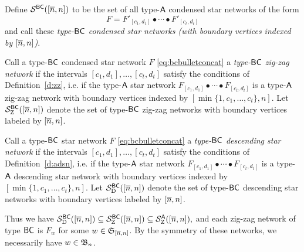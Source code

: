 \documentclass[11pt]{article}
\theoremstyle{definition}
\numberwithin{equation}{section}
\begin{document}
\begin{defn}\label{d:bcstarnet}
  Define $\mathcal S^{\mathsf{BC}}([\overline{n}, n])$ to be
  the set of all type-$\mathsf{A}$ condensed star networks of the form
\begin{equation}\label{eq:bcbulletconcat}
  F = F'_{[c_1,d_1]} \bullet \cdots \bullet F'_{[c_t,d_t]}
  \end{equation}
and call these
{\em type-$\mathsf{BC}$ condensed star networks
  (with boundary vertices indexed by $[\overline{n},n]$)}.
\end{defn}
\begin{defn}\label{d:bczzn}
Call a type-$\mathsf{BC}$ condensed star network $F$ \eqref{eq:bcbulletconcat} a
{\em type-$\mathsf{BC}$ zig-zag network} if
the intervals $[c_1,d_1],\dotsc,[c_t,d_t]$
satisfy the conditions of Definition~\ref{d:zz},
i.e. if the type-$\mathsf{A}$ star network
$F_{[c_1,d_1]} \bullet \cdots \bullet F_{[c_t,d_t]}$
is a type-$\mathsf{A}$ zig-zag network with boundary vertices indexed by
$[ \min\{1,c_1,\dotsc,c_t\}, n]$.
Let $\mathcal S^{\mathsf{BC}}_{\mathrm Z}([\overline{n},n])$
denote the set of type-$\mathsf{BC}$ zig-zag networks with boundary vertices
labeled by $[\overline{n},n]$.
\end{defn}
\begin{defn}\label{d:bcdsn}
Call a type-$\mathsf{BC}$ star network $F$ \eqref{eq:bcbulletconcat} a
{\em type-$\mathsf{BC}$ descending star network} if
the intervals $[c_1,d_1],\dotsc,[c_t,d_t]$
satisfy the conditions of Definition~\ref{d:adsn},
i.e. if the type-$\mathsf{A}$ star network
$F_{[c_1,d_1]} \bullet \cdots \bullet F_{[c_t,d_t]}$
is a type-$\mathsf{A}$ descending star network with boundary vertices indexed by
$[ \min\{1, c_1,\dotsc,c_t\}, n]$.
Let $\mathcal S^{\mathsf{BC}}_{\mathrm D}([\overline{n},n])$
denote the set of type-$\mathsf{BC}$ descending star
networks with boundary vertices
labeled by $[\overline{n},n]$.
\end{defn}
Thus we have $\mathcal S^{\mathsf{BC}}_{\mathrm D}([\overline{n},n]) \subseteq \mathcal S^{\mathsf{BC}}_{\mathrm Z}([\overline{n},n])
\subseteq \mathcal S^{\mathsf{A}}_{\mathrm Z}([\overline{n},n]),$
and each zig-zag network of type $\mathsf{BC}$
is $F_w$ for some $w \in \mathfrak{S}_{[\overline{n}, n]}$.
By the symmetry of these networks, we necessarily have $w \in \mathfrak{B}_n$. 
\end{document}
